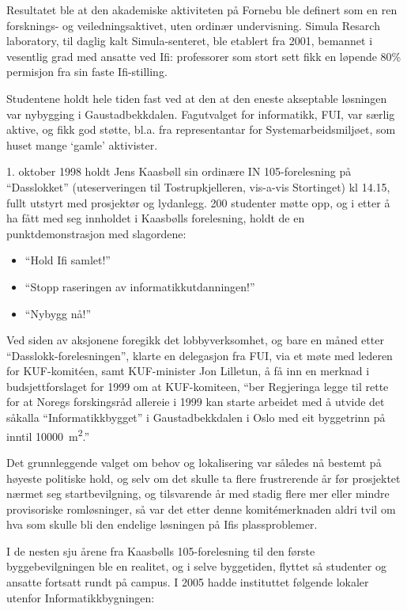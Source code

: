 Resultatet ble at den akademiske aktiviteten på Fornebu ble definert som en ren forsknings- og veiledningsaktivet, uten ordinær undervisning. Simula Resarch laboratory, til daglig kalt Simula-senteret, ble etablert fra 2001, bemannet i vesentlig grad med ansatte ved Ifi: professorer som stort sett fikk en løpende 80\% permisjon fra sin faste Ifi-stilling.

Studentene holdt hele tiden fast ved at den at den eneste akseptable løsningen var nybygging i Gaustadbekkdalen. Fagutvalget for informatikk, FUI, var særlig aktive, og fikk god støtte, bl.a. fra representantar for Systemarbeidsmiljøet, som huset mange `gamle' aktivister.

1. oktober 1998 holdt Jens Kaasbøll sin ordinære IN 105-forelesning på ``Dasslokket'' (uteserveringen til Tostrupkjelleren, vis-a-vis Stortinget) kl 14.15, fullt utstyrt med prosjektør og lydanlegg. 200 studenter møtte opp, og i etter å ha fått med seg innholdet i Kaasbølls forelesning, holdt de en punktdemonstrasjon med slagordene:

\begin{itemize}
	\item ``Hold Ifi samlet!''
	\item ``Stopp raseringen av informatikkutdanningen!''
	\item ``Nybygg nå!''
\end{itemize}

Ved siden av aksjonene foregikk det lobbyverksomhet, og bare en måned etter ``Dasslokk-forelesningen'', klarte en delegasjon fra FUI, via et møte med lederen for KUF-komitéen, samt KUF-minister Jon Lilletun, å få inn en merknad i budsjettforslaget for 1999 om at KUF-komiteen, ``ber Regjeringa legge til rette for at Noregs forskingsråd allereie i 1999 kan starte arbeidet med å utvide det såkalla ``Informatikkbygget'' i Gaustadbekkdalen i Oslo med eit byggetrinn på inntil \SI{10 000}{\metre\squared}.''

Det grunnleggende valget om behov og lokalisering var således nå bestemt på høyeste politiske hold, og selv om det skulle ta flere frustrerende år før prosjektet nærmet seg startbevilgning, og tilsvarende år med stadig flere mer eller mindre provisoriske romløsninger, så var det etter denne komitémerknaden aldri tvil om hva som skulle bli den endelige løsningen på Ifis plassproblemer.

I de nesten sju årene fra Kaasbølls 105-forelesning til den første byggebevilgningen ble en realitet, og i selve byggetiden, flyttet så studenter og ansatte fortsatt rundt på campus. I 2005 hadde instituttet følgende lokaler utenfor Informatikkbygningen:

